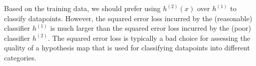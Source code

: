 \documentclass[12pt]{report}
\begin{document}
Based on the training data, we should prefer using $h^{(2)}(x)$ 
over $h^{(1)}$ to classify datapoints. However, the squared error 
loss incurred by the (reasonable) classifier $h^{(1)}$ is much larger 
than the squared error loss incurred by the (poor) classifier $h^{(2)}$. 
The squared error loss is typically a bad choice for assessing 
the quality of a hypothesis map that is used for classifying datapoints 
into different categories. 

\end{document}
